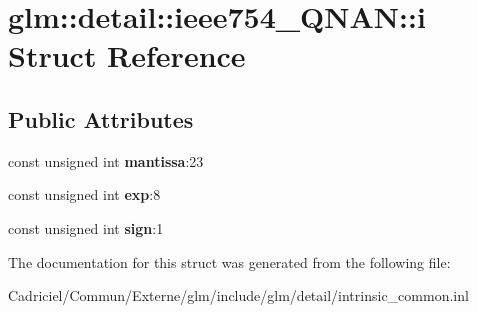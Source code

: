 \hypertarget{structglm_1_1detail_1_1ieee754___q_n_a_n_1_1i}{}\section{glm\+:\+:detail\+:\+:ieee754\+\_\+\+Q\+N\+AN\+:\+:i Struct Reference}
\label{structglm_1_1detail_1_1ieee754___q_n_a_n_1_1i}
\subsection*{Public Attributes}
\begin{DoxyCompactItemize}
\item 
const unsigned int {\bfseries mantissa}\+:23\hypertarget{structglm_1_1detail_1_1ieee754___q_n_a_n_1_1i_a1999926defcba631a716bee7d3044d0a}{}\label{structglm_1_1detail_1_1ieee754___q_n_a_n_1_1i_a1999926defcba631a716bee7d3044d0a}

\item 
const unsigned int {\bfseries exp}\+:8\hypertarget{structglm_1_1detail_1_1ieee754___q_n_a_n_1_1i_abc8cdb38ff3aa6a09214f7bfa32efac8}{}\label{structglm_1_1detail_1_1ieee754___q_n_a_n_1_1i_abc8cdb38ff3aa6a09214f7bfa32efac8}

\item 
const unsigned int {\bfseries sign}\+:1\hypertarget{structglm_1_1detail_1_1ieee754___q_n_a_n_1_1i_a5dd7e174864b6a8cd045563dde44f305}{}\label{structglm_1_1detail_1_1ieee754___q_n_a_n_1_1i_a5dd7e174864b6a8cd045563dde44f305}

\end{DoxyCompactItemize}


The documentation for this struct was generated from the following file\+:\begin{DoxyCompactItemize}
\item 
Cadriciel/\+Commun/\+Externe/glm/include/glm/detail/intrinsic\+\_\+common.\+inl\end{DoxyCompactItemize}
